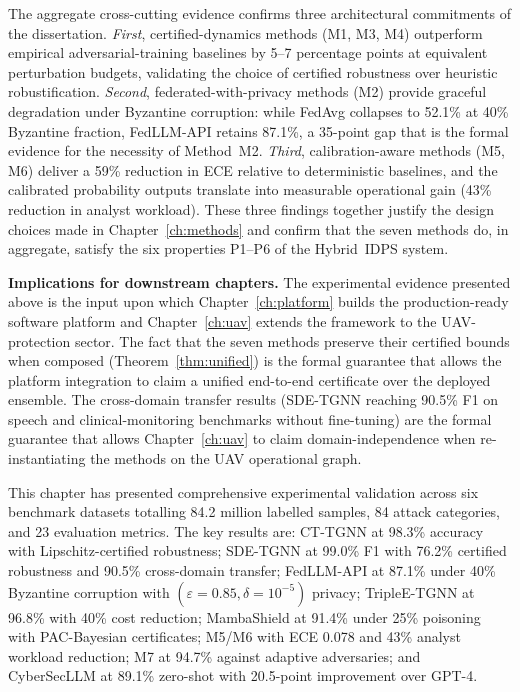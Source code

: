 The aggregate cross-cutting evidence confirms three architectural commitments of the dissertation. \emph{First}, certified-dynamics methods (M1, M3, M4) outperform empirical adversarial-training baselines by 5--7 percentage points at equivalent perturbation budgets, validating the choice of certified robustness over heuristic robustification. \emph{Second}, federated-with-privacy methods (M2) provide graceful degradation under Byzantine corruption: while FedAvg collapses to 52.1\% at 40\% Byzantine fraction, FedLLM-API retains 87.1\%, a 35-point gap that is the formal evidence for the necessity of Method~M2. \emph{Third}, calibration-aware methods (M5, M6) deliver a 59\% reduction in ECE relative to deterministic baselines, and the calibrated probability outputs translate into measurable operational gain (43\% reduction in analyst workload). These three findings together justify the design choices made in Chapter~\ref{ch:methods} and confirm that the seven methods do, in aggregate, satisfy the six properties P1--P6 of the Hybrid~IDPS system.

\noindent\textbf{Implications for downstream chapters.} The experimental evidence presented above is the input upon which Chapter~\ref{ch:platform} builds the production-ready software platform and Chapter~\ref{ch:uav} extends the framework to the UAV-protection sector. The fact that the seven methods preserve their certified bounds when composed (Theorem~\ref{thm:unified}) is the formal guarantee that allows the platform integration to claim a unified end-to-end certificate over the deployed ensemble. The cross-domain transfer results (SDE-TGNN reaching 90.5\% F1 on speech and clinical-monitoring benchmarks without fine-tuning) are the formal guarantee that allows Chapter~\ref{ch:uav} to claim domain-independence when re-instantiating the methods on the UAV operational graph.

\label{sec:ch4_summary}%

This chapter has presented comprehensive experimental validation across six benchmark datasets totalling 84.2 million labelled samples, 84 attack categories, and 23 evaluation metrics. The key results are: CT-TGNN at 98.3\% accuracy with Lipschitz-certified robustness; SDE-TGNN at 99.0\% F1 with 76.2\% certified robustness and 90.5\% cross-domain transfer; FedLLM-API at 87.1\% under 40\% Byzantine corruption with $(\varepsilon{=}0.85,\delta{=}10^{-5})$ privacy; TripleE-TGNN at 96.8\% with 40\% cost reduction; MambaShield at 91.4\% under 25\% poisoning with PAC-Bayesian certificates; M5/M6 with ECE 0.078 and 43\% analyst workload reduction; M7 at 94.7\% against adaptive adversaries; and CyberSecLLM at 89.1\% zero-shot with 20.5-point improvement over GPT-4.

